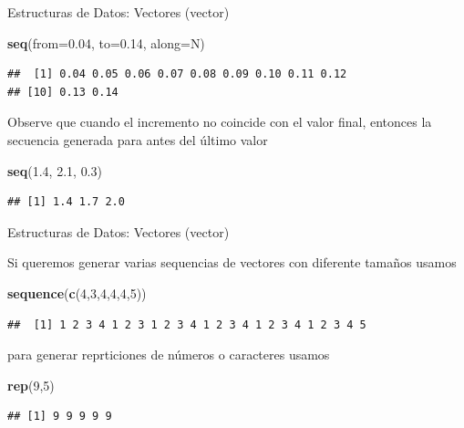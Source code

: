 \documentclass[ignorenonframetext,]{beamer}
\newenvironment{Shaded}{\begin{snugshade}}{\end{snugshade}}
\newcommand{\KeywordTok}[1]{\textcolor[rgb]{0.13,0.29,0.53}{\textbf{#1}}}
\newcommand{\DataTypeTok}[1]{\textcolor[rgb]{0.13,0.29,0.53}{#1}}
\newcommand{\DecValTok}[1]{\textcolor[rgb]{0.00,0.00,0.81}{#1}}
\newcommand{\FloatTok}[1]{\textcolor[rgb]{0.00,0.00,0.81}{#1}}
\newcommand{\NormalTok}[1]{#1}
\begin{document}
\begin{frame}[fragile]{Estructuras de Datos: Vectores (vector)}

\begin{Shaded}
\begin{Highlighting}[]
\KeywordTok{seq}\NormalTok{(}\DataTypeTok{from=}\FloatTok{0.04}\NormalTok{, }\DataTypeTok{to=}\FloatTok{0.14}\NormalTok{, }\DataTypeTok{along=}\NormalTok{N)}
\end{Highlighting}
\end{Shaded}

\begin{verbatim}
##  [1] 0.04 0.05 0.06 0.07 0.08 0.09 0.10 0.11 0.12
## [10] 0.13 0.14
\end{verbatim}

Observe que cuando el incremento no coincide con el valor final,
entonces la secuencia generada para antes del último valor

\begin{Shaded}
\begin{Highlighting}[]
\KeywordTok{seq}\NormalTok{(}\FloatTok{1.4}\NormalTok{, }\FloatTok{2.1}\NormalTok{, }\FloatTok{0.3}\NormalTok{)}
\end{Highlighting}
\end{Shaded}

\begin{verbatim}
## [1] 1.4 1.7 2.0
\end{verbatim}

\end{frame}

\begin{frame}[fragile]{Estructuras de Datos: Vectores (vector)}

Si queremos generar varias sequencias de vectores con diferente tamaños
usamos

\begin{Shaded}
\begin{Highlighting}[]
\KeywordTok{sequence}\NormalTok{(}\KeywordTok{c}\NormalTok{(}\DecValTok{4}\NormalTok{,}\DecValTok{3}\NormalTok{,}\DecValTok{4}\NormalTok{,}\DecValTok{4}\NormalTok{,}\DecValTok{4}\NormalTok{,}\DecValTok{5}\NormalTok{))}
\end{Highlighting}
\end{Shaded}

\begin{verbatim}
##  [1] 1 2 3 4 1 2 3 1 2 3 4 1 2 3 4 1 2 3 4 1 2 3 4 5
\end{verbatim}

para generar reprticiones de números o caracteres usamos

\begin{Shaded}
\begin{Highlighting}[]
\KeywordTok{rep}\NormalTok{(}\DecValTok{9}\NormalTok{,}\DecValTok{5}\NormalTok{)}
\end{Highlighting}
\end{Shaded}

\begin{verbatim}
## [1] 9 9 9 9 9
\end{verbatim}

\end{frame}
\end{document}
